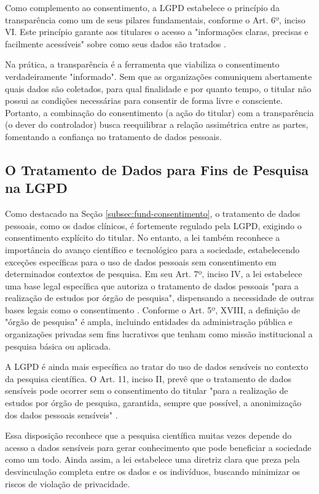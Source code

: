Como complemento ao consentimento, a LGPD estabelece o princípio da transparência como um de seus pilares fundamentais, conforme o Art. 6º, inciso VI. Este princípio garante aos titulares o acesso a "informações claras, precisas e facilmente acessíveis" sobre como seus dados são tratados \cite{Brasil2018lgpd}.

Na prática, a transparência é a ferramenta que viabiliza o consentimento verdadeiramente "informado". Sem que as organizações comuniquem abertamente quais dados são coletados, para qual finalidade e por quanto tempo, o titular não possui as condições necessárias para consentir de forma livre e consciente. Portanto, a combinação do consentimento (a ação do titular) com a transparência (o dever do controlador) busca reequilibrar a relação assimétrica entre as partes, fomentando a confiança no tratamento de dados pessoais.

\subsection{O Tratamento de Dados para Fins de Pesquisa na LGPD}
\label{subsec:fund-pesquisa-lgpd}

Como destacado na Seção \ref{subsec:fund-consentimento}, o tratamento de dados pessoais, como os dados clínicos, é fortemente regulado pela LGPD, exigindo o consentimento explícito do titular. No entanto, a lei também reconhece a importância do avanço científico e tecnológico para a sociedade, estabelecendo exceções específicas para o uso de dados pessoais sem consentimento em determinados contextos de pesquisa. Em seu Art. 7º, inciso IV, a lei estabelece uma base legal específica que autoriza o tratamento de dados pessoais "para a realização de estudos por órgão de pesquisa", dispensando a necessidade de outras bases legais como o consentimento \cite{Brasil2018lgpd}. Conforme o Art. 5º, XVIII, a definição de "órgão de pesquisa" é ampla, incluindo entidades da administração pública e organizações privadas sem fins lucrativos que tenham como missão institucional a pesquisa básica ou aplicada.

A LGPD é ainda mais específica ao tratar do uso de dados sensíveis no contexto da pesquisa científica. O Art. 11, inciso II, prevê que o tratamento de dados sensíveis pode ocorrer sem o consentimento do titular "para a realização de estudos por órgão de pesquisa, garantida, sempre que possível, a anonimização dos dados pessoais sensíveis" \cite{Brasil2018lgpd}. 

Essa disposição reconhece que a pesquisa científica muitas vezes depende do acesso a dados sensíveis para gerar conhecimento que pode beneficiar a sociedade como um todo. Ainda assim, a lei estabelece uma diretriz clara que preza pela desvinculação completa entre os dados e os indivíduos, buscando minimizar os riscos de violação de privacidade.

